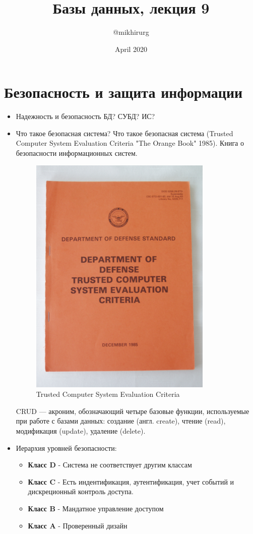 \documentclass{article}
\title{Базы данных, лекция 9}
\author{@mikhirurg}
\date{April 2020}
\begin{document}
\maketitle

\section{Безопасность и защита информации}

\begin{itemize}
    \item Надежность и безопасность БД? СУБД? ИС?
    \newline 
    \item Что такое безопасная система?
    \newline Что такое безопасная система (Trusted Computer System Evaluation Criteria "The Orange Book" 1985). 
    \newline Книга о безопасности информационных систем.
    \begin{figure}[H]
    \centering
    \includegraphics[width = .5\linewidth]{img0}
    \caption{Trusted Computer System Evaluation Criteria}
  \end{figure}
    CRUD — акроним, обозначающий четыре базовые функции, используемые при работе с базами данных: создание (англ. create), чтение (read), модификация (update), удаление (delete).
    \item Иерархия уровней безопасности:  
    \begin{itemize}
        \item \textbf{Класс D} - Система не соответствует другим классам
        \item \textbf{Класс C} - Есть индентификация, аутентификация, учет событий и дискреционный контроль доступа.
        \item \textbf{Класс B} - Мандатное управление доступом
        \item \textbf{Класс A} - Проверенный дизайн
    \end{itemize}
\end{itemize}
\end{document}
